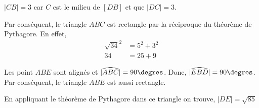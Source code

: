 %
%
    $|CB| = 3$ car $C$ est le milieu de $[DB]$ et que $|DC| = 3$.

    Par conséquent, le triangle $ABC$ est rectangle par la réciproque du théorème de Pythagore. En effet,
    \begin{align*}
        \sqrt{34}^2 &= 5^2 + 3^2\\
        34 &= 25 + 9
    \end{align*}

    Les point $ABE$ sont alignés et $|\widehat{ABC}| = 90\degres$. Donc, $|\widehat{EBD}| = 90\degres$. Par conséquent, le triangle $ABE$ est aussi rectangle.

    En appliquant le théorème de Pythagore dans ce triangle on trouve,
    $|DE| = \sqrt{85}$
    \newpage
